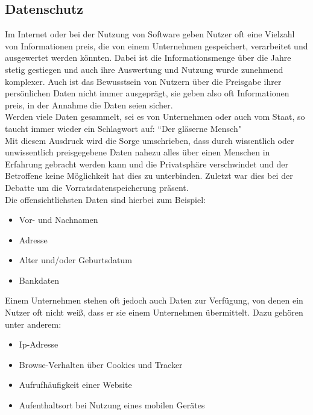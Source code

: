 \documentclass[a4paper, 12pt]{article}
\begin{document}
\subsection{Datenschutz}

Im Internet oder bei der Nutzung von Software geben Nutzer oft eine Vielzahl von Informationen preis, die von einem Unternehmen gespeichert, verarbeitet und ausgewertet werden könnten. Dabei ist die Informationsmenge über die Jahre stetig gestiegen und auch ihre Auswertung und Nutzung wurde zunehmend komplexer. Auch ist das Bewusstsein von Nutzern über die Preisgabe ihrer persönlichen Daten nicht immer ausgeprägt, sie geben also oft Informationen preis, in der Annahme die Daten seien sicher.\\
Werden viele Daten gesammelt, sei es von Unternehmen oder auch vom Staat, so taucht immer wieder ein Schlagwort auf: ``Der gläserne Mensch"\\
Mit diesem Ausdruck wird die Sorge umschrieben, dass durch wissentlich oder unwissentlich preisgegebene Daten nahezu alles über einen Menschen in Erfahrung gebracht werden kann und die Privatsphäre verschwindet und der Betroffene keine Möglichkeit hat dies zu unterbinden. Zuletzt war dies bei der Debatte um die Vorratsdatenspeicherung präsent.\\

\noindent Die offensichtlichsten Daten sind hierbei zum Beispiel:
\begin{itemize}
\item Vor- und Nachnamen
\item Adresse 
\item Alter und/oder Geburtsdatum
\item Bankdaten
\end{itemize}

\newpage
\noindent 
Einem Unternehmen stehen oft jedoch auch Daten zur Verfügung, von denen ein Nutzer oft nicht weiß, dass er sie einem Unternehmen übermittelt. Dazu gehören unter anderem:
\begin{itemize}
\item Ip-Adresse
\item Browse-Verhalten über Cookies und Tracker
\item Aufrufhäufigkeit einer Website
\item Aufenthaltsort bei Nutzung eines mobilen Gerätes
\end{itemize}
\end{document}
